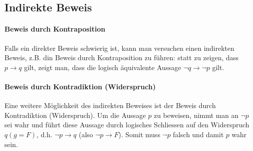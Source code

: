 \documentclass[12pt,a4paper]{article}
\begin{document}
\subsection{Indirekte Beweis}
\paragraph{Beweis durch Kontraposition}Falls ein direkter Beweis schwierig ist, kann man versuchen einen indirekten Beweis, z.B. din Beweis durch Kontraposition zu führen: statt zu zeigen, dass $p \rightarrow q$ gilt, zeigt man, dass die logisch äquivalente Aussage $\neg q \rightarrow \neg p$ gilt.
\paragraph{Beweis durch Kontradiktion (Widerspruch)}Eine weitere Möglichkeit des indirekten Beweises ist der Beweis durch Kontradiktion (Widerspruch). Um die Aussage $p$ zu beweisen, nimmt man an $\neg p$ sei wahr und führt diese Aussage durch logisches Schliessen auf den Widerspruch $q (g=F)$, d.h. $\neg p \rightarrow q$ (also $\neg p \rightarrow F$). Somit muss $\neg p$ falsch und damit $p$ wahr sein.
\end{document}
